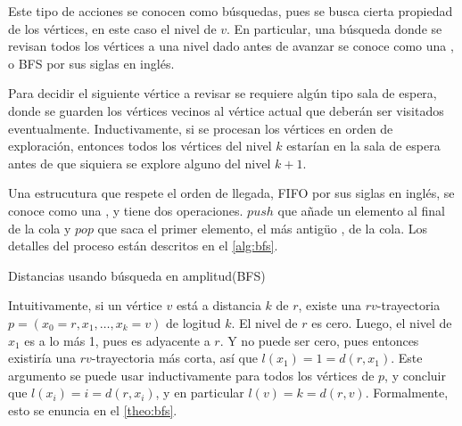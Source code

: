 Este tipo de acciones se conocen como búsquedas, pues se busca cierta propiedad
de los vértices, en este caso el nivel de $v$. En particular, una búsqueda donde
se revisan todos los vértices a una nivel dado antes de avanzar se conoce como
una , o BFS por sus siglas en inglés.

Para decidir el siguiente vértice a revisar se requiere algún tipo sala de
espera, donde se guarden los vértices vecinos al vértice actual que deberán ser
visitados eventualmente. Inductivamente, si se procesan los vértices en orden de
exploración, entonces todos los vértices del nivel $k$ estarían en la sala de
espera antes de que siquiera se explore alguno del nivel $k+1$.

Una estrucutura que respete el orden de llegada, FIFO por sus siglas en inglés,
se conoce como una , y tiene dos operaciones. $push$ que añade un
elemento al final de la cola y $pop$ que saca el primer elemento, el más antigüo
, de la cola. Los detalles del proceso están descritos en el \cref{alg:bfs}.

\begin{algorithm}
  \caption[BFS]{Distancias usando búsqueda en amplitud(BFS)}
  \label{alg:bfs}
  \begin{algorithmic}[1]
      \State {}
         
           \label{alg:bfs:visit}
             \label{alg:bfs:level}
            \State {}
          \EndIf
        \EndFor
      \EndWhile
    \EndFunction
  \end{algorithmic}
\end{algorithm}

Intuitivamente, si un vértice $v$ está a distancia $k$ de $r$, existe una
$rv$-trayectoria $p = (x_{0} = r, x_{1}, \dots, x_{k} = v)$ de logitud $k$. El
nivel de $r$ es cero. Luego, el nivel de $x_{1}$ es a lo más 1, pues es
adyacente a $r$. Y no puede ser cero, pues entonces existiría una
$rv$-trayectoria más corta, así que $l(x_{1}) = 1 = d(r, x_{1})$. Este argumento
se puede usar inductivamente para todos los vértices de $p$, y concluir que
$l(x_{i}) = i = d(r, x_{i})$, y en particular $l(v) = k = d(r, v)$. Formalmente,
esto se enuncia en el \cref{theo:bfs}.

